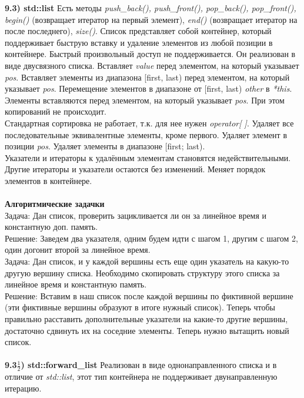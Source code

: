 \documentclass{article}
\begin{document}
\noindent \textbf{9.3) std::list}
Есть методы \textit{push\_back(), push\_front(), pop\_back(), pop\_front(), begin()} (возвращает итератор на первый элемент), \textit{end()} (возвращает итератор на после последнего), \textit{size()}.
Список представляет собой контейнер, который поддерживает быструю вставку и удаление элементов из любой позиции в контейнере. Быстрый произвольный доступ не поддерживается. Он реализован в виде двусвязного списка. 
Вставляет \textit{value} перед элементом, на который указывает \textit{pos}. 
Вставляет элементы из диапазона [first, last) перед элементом, на который указывает \textit{pos}.
Перемещение элементов в диапазоне от [first, last) \textit{other} в \textit{*this}. Элементы вставляются перед элементом, на который указывает \textit{pos}. При этом копирований не происходит.\\
Стандартная сортировка не работает, т.к. для нее нужен \textit{operator[ ]}.
Удаляет все последовательные эквивалентные элементы, кроме первого.
Удаляет элемент в позиции \textit{pos}.
Удаляет элементы в диапазоне [first; last).\\
Указатели и итераторы к удалённым элементам становятся недействительными. Другие итераторы и указатели остаются без изменений. 
Меняет порядок элементов в контейнере.\\\\
\noindent \textbf{Алгоритмические задачки}\\
Задача: Дан список, проверить зацикливается ли он за линейное время и константную доп. память.\\
Решение: Заведем два указателя, одним будем идти с шагом 1, другим с шагом 2, один догонит второй за линейное время.\\
Задача: Дан список, и у каждой вершины есть еще один указатель на какую-то другую вершину списка. Необходимо скопировать структуру этого списка за линейное время и константную память.\\
Решение: Вставим в наш список после каждой вершины по фиктивной вершине (эти фиктивные вершины образуют в итоге нужный список). Теперь чтобы правильно расставить дополнительные указатели на какие-то другие вершины, достаточно сдвинуть их на соседние элементы. Теперь нужно вытащить новый список.\\
\noindent \\ \textbf{9.3$\frac{1}{2}$) std::forward\_list}
Реализован в виде однонаправленного списка и в отличие от \textit{std::list}, этот тип контейнера не поддерживает двунаправленную итерацию. 
\end{document}

